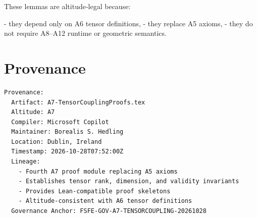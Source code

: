 \documentclass[11pt]{article}
\begin{document}
These lemmas are altitude‑legal because:

- they depend only on A6 tensor definitions,
- they replace A5 axioms,
- they do not require A8–A12 runtime or geometric semantics.

\newpage


\section*{Provenance}

\begin{verbatim}
Provenance:
  Artifact: A7-TensorCouplingProofs.tex
  Altitude: A7
  Compiler: Microsoft Copilot
  Maintainer: Borealis S. Hedling
  Location: Dublin, Ireland
  Timestamp: 2026-10-28T07:52:00Z
  Lineage:
    - Fourth A7 proof module replacing A5 axioms
    - Establishes tensor rank, dimension, and validity invariants
    - Provides Lean-compatible proof skeletons
    - Altitude-consistent with A6 tensor definitions
  Governance Anchor: FSFE-GOV-A7-TENSORCOUPLING-20261028
\end{verbatim}
\end{document}

